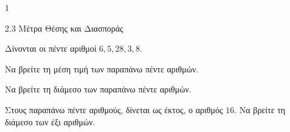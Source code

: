 \begin{ylh}{1}
    \item 2.3 Μέτρα Θέσης και Διασποράς
\end{ylh}
Δίνονται οι πέντε αριθμοί $6, 5, 28, 3, 8$.
\begin{alist}
    \item Να βρείτε τη μέση τιμή των παραπάνω πέντε αριθμών. 
    \item Να βρείτε τη διάμεσο των παραπάνω πέντε αριθμών. 
    \item Στους παραπάνω πέντε αριθμούς, δίνεται ως έκτος, ο αριθμός $16$. Να βρείτε τη διάμεσο των έξι αριθμών. 
\end{alist}

